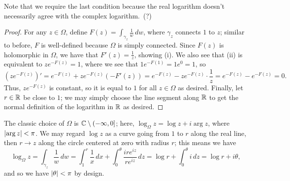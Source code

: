\noindent Note that we require the last condition because the real logarithm doesn't necessarily agree with the complex logarithm.\ (?)
\begin{proof}
    For any $z \in \Omega$, define $F(z) = \int_{\gamma_z} \frac{1}{w} \, dw$, where $\gamma_z$ connects $1$ to $z$; similar to before, $F$ is well-defined because $\Omega$ is simply connected. Since $F(z)$ is holomorphic in $\Omega$, we have that $F'(z) = \frac{1}{z}$, showing (i). We also see that (ii) is equivalent to $z e^{-F(z)} = 1$, where we see that $1 e^{-F(1)} = 1 e^0 = 1$, so
    \[ (z e^{-F(z)})' = e^{-F(z)} + ze^{-F(z)} (-F'(z)) = e^{-F(z)} - ze^{-F(z)} \cdot \frac{1}{z} = e^{-F(z)} - e^{-F(z)} = 0. \]
    Thus, $z e^{-F(z)}$ is constant, so it is equal to $1$ for all $z \in \Omega$ as desired. Finally, let $r \in \mathbb R$ be close to $1$; we may simply choose the line segment along $\mathbb R$ to get the normal definition of the logarithm in $\mathbb R$ as desired.
\end{proof}
\noindent The classic choice of $\Omega$ is $\mathbb C \setminus (-\infty, 0]$; here, $\log_\Omega z = \log z + i \arg z$, where $\left\lvert \arg z \right\rvert < \pi$. We may regard $\log z$ as a curve going from $1$ to $r$ along the real line, then $r \to z$ along the circle centered at zero with radius $r$; this means we have
\[ \log_\Omega z = \int_{\gamma_z} \frac{1}{w} \, dw = \int_1^r \frac{1}{x} \, dx + \int_0^\theta \frac{i re^{iz}}{re^{iz}} \, dz = \log r + \int_0^\theta i \, dz = \log r + i \theta, \]
and so we have $\left\lvert \theta \right\rvert < \pi$ by design.